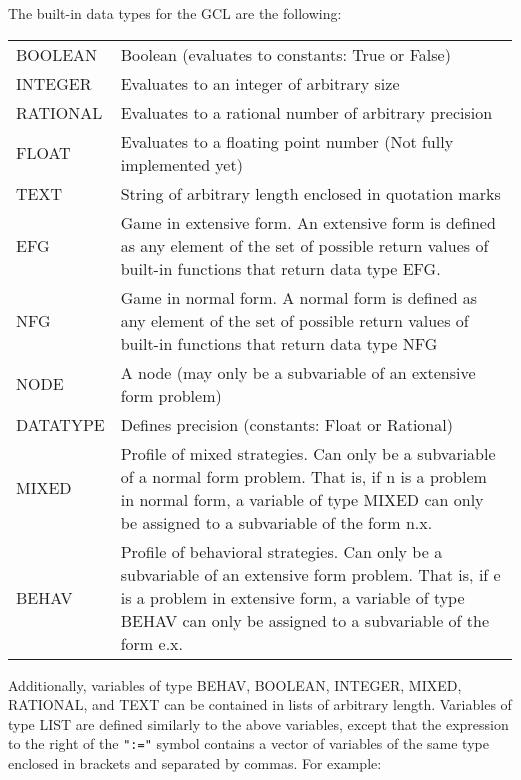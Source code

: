 The built-in data types for the GCL are the following:  

\medskip

\begin{tabular}{lp{4in}}
BOOLEAN & Boolean (evaluates to constants: True or False)\\ 

INTEGER & Evaluates to an integer of arbitrary size \\ 

RATIONAL & Evaluates to a rational number of arbitrary precision\\ 

FLOAT 	& Evaluates to a floating point number (Not fully implemented yet)\\

TEXT	& String of arbitrary length enclosed in quotation marks\\ 

EFG	& Game in extensive form.  An extensive form is defined as any
element of the set of possible return values of built-in functions
that return data type EFG.\\

NFG	& Game in normal form.  A normal form is defined as any
element of the set of possible return values of built-in functions
that return data type NFG\\

NODE	& A node (may only be a subvariable of an extensive
form problem) \\ 

DATATYPE & Defines precision (constants: Float or
Rational) \\ 

MIXED	& {Profile of mixed strategies.  Can only be a
subvariable of a normal form problem.  That is, if n is a problem in
normal form, a variable of type MIXED can only be assigned to a
subvariable of the form n.x.}\\ 

BEHAV	& Profile of behavioral
strategies.  Can only be a subvariable of an extensive form problem.
That is, if e is a problem in extensive form, a variable of type BEHAV
can only be assigned to a subvariable of the form e.x. \\
\end{tabular}

\medskip

\noindent
Additionally, variables of type BEHAV, BOOLEAN, INTEGER, MIXED,
RATIONAL, and TEXT can be contained in lists of arbitrary length.
Variables of type LIST are defined similarly to the above variables,
except that the expression to the right of the {\tt ":="} symbol
contains a vector of variables of the same type enclosed in brackets
and separated by commas.  For example:

